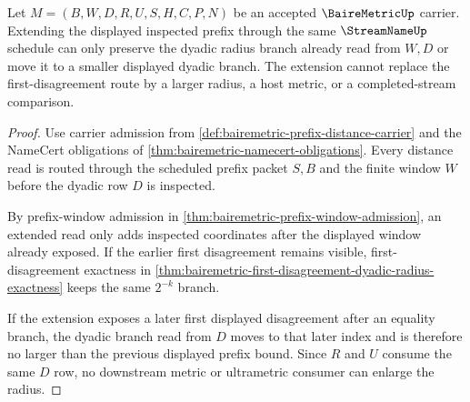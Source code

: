 \begin{theorem}
\label{thm:bairemetric-prefix-radius-monotonicity}
Let $M=(B,W,D,R,U,S,H,C,P,N)$ be an accepted $\BaireMetricUp$ carrier. Extending the displayed inspected prefix through the same $\StreamNameUp$ schedule can only preserve the dyadic radius branch already read from $W,D$ or move it to a smaller displayed dyadic branch. The extension cannot replace the first-disagreement route by a larger radius, a host metric, or a completed-stream comparison.
\end{theorem}
\begin{proof}
Use carrier admission from \autoref{def:bairemetric-prefix-distance-carrier} and the NameCert obligations of \autoref{thm:bairemetric-namecert-obligations}. Every distance read is routed through the scheduled prefix packet $S,B$ and the finite window $W$ before the dyadic row $D$ is inspected.

By prefix-window admission in \autoref{thm:bairemetric-prefix-window-admission}, an extended read only adds inspected coordinates after the displayed window already exposed. If the earlier first disagreement remains visible, first-disagreement exactness in \autoref{thm:bairemetric-first-disagreement-dyadic-radius-exactness} keeps the same $2^{-k}$ branch.

If the extension exposes a later first displayed disagreement after an equality branch, the dyadic branch read from $D$ moves to that later index and is therefore no larger than the previous displayed prefix bound. Since $R$ and $U$ consume the same $D$ row, no downstream metric or ultrametric consumer can enlarge the radius.
\end{proof}

